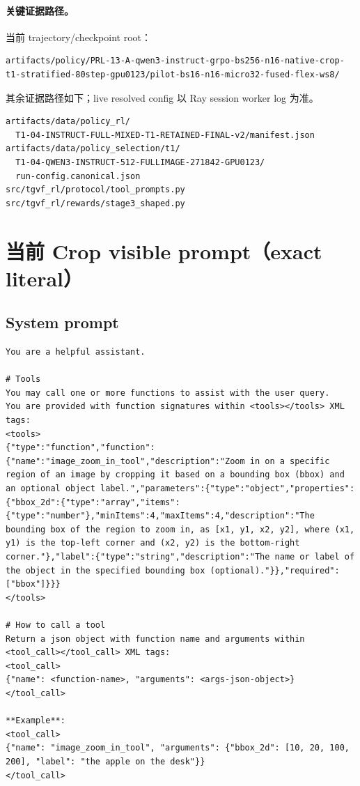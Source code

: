\documentclass[UTF8,twocolumn,10pt,a4paper]{ctexart}
\begin{document}
\paragraph{关键证据路径。}
当前 trajectory/checkpoint root：
\begin{Verbatim}[breaklines=true,breakanywhere=true,fontsize=\scriptsize]
artifacts/policy/PRL-13-A-qwen3-instruct-grpo-bs256-n16-native-crop-t1-stratified-80step-gpu0123/pilot-bs16-n16-micro32-fused-flex-ws8/
\end{Verbatim}
其余证据路径如下；live resolved config 以 Ray session worker log 为准。
\begin{Verbatim}[breaklines=true,breakanywhere=true,fontsize=\scriptsize]
artifacts/data/policy_rl/
  T1-04-INSTRUCT-FULL-MIXED-T1-RETAINED-FINAL-v2/manifest.json
artifacts/data/policy_selection/t1/
  T1-04-QWEN3-INSTRUCT-512-FULLIMAGE-271842-GPU0123/
  run-config.canonical.json
src/tgvf_rl/protocol/tool_prompts.py
src/tgvf_rl/rewards/stage3_shaped.py
\end{Verbatim}

\clearpage
\onecolumn
\appendix
\small
\setlength{\parskip}{0pt}
\section{当前 Crop visible prompt（exact literal）}
\label{app:prompts}

\subsection{System prompt}

\begin{Verbatim}[breaklines=true,breakanywhere=true,fontsize=\scriptsize]
You are a helpful assistant.

# Tools
You may call one or more functions to assist with the user query.
You are provided with function signatures within <tools></tools> XML tags:
<tools>
{"type":"function","function":{"name":"image_zoom_in_tool","description":"Zoom in on a specific region of an image by cropping it based on a bounding box (bbox) and an optional object label.","parameters":{"type":"object","properties":{"bbox_2d":{"type":"array","items":{"type":"number"},"minItems":4,"maxItems":4,"description":"The bounding box of the region to zoom in, as [x1, y1, x2, y2], where (x1, y1) is the top-left corner and (x2, y2) is the bottom-right corner."},"label":{"type":"string","description":"The name or label of the object in the specified bounding box (optional)."}},"required":["bbox"]}}}
</tools>

# How to call a tool
Return a json object with function name and arguments within <tool_call></tool_call> XML tags:
<tool_call>
{"name": <function-name>, "arguments": <args-json-object>}
</tool_call>

**Example**:
<tool_call>
{"name": "image_zoom_in_tool", "arguments": {"bbox_2d": [10, 20, 100, 200], "label": "the apple on the desk"}}
</tool_call>
\end{Verbatim}
\end{document}
